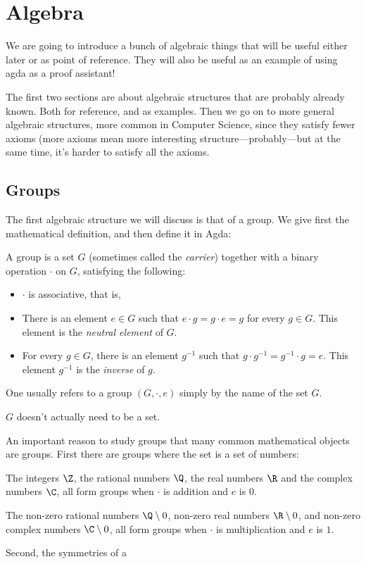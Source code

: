 \section{Algebra}
We are going to introduce a bunch of algebraic things that will be useful either later or as point of reference. They will also be useful as an example of using agda as a proof assistant!

The first two sections are about algebraic structures that are probably already known. Both for reference, and as examples. Then we go on to more general algebraic structures, more common in Computer Science, since they satisfy fewer axioms (more axioms mean more interesting structure---probably---but at the same time, it's harder to satisfy all the axioms.
\subsection{Groups}
The first algebraic structure we will discuss is that of a group. We give first the mathematical definition, and then define it in Agda:
\begin{Definition}
A group is a set $G$ (sometimes called the \emph{carrier}) together with a binary operation $\cdot$ on $G$, satisfying the following:
\begin{itemize}
\item $\cdot$ is associative, that is, 
\item There is an element $e \in G$ such that $e \cdot g = g \cdot e = g$ for every $g \in G$. This element is the \emph{neutral element} of $G$.
\item For every $g \in G$, there is an element $g^{-1}$ such that $g \cdot g^{-1} = g^{-1} \cdot g = e$. This element $g^{-1}$ is the \emph{inverse} of $g$.
\end{itemize}
\end{Definition}
\begin{Remark}
One usually refers to a group $(G, \cdot, e)$ simply by the name of the set $G$.
\end{Remark}
\begin{Remark}
$G$ doesn't actually need to be a set. 
\end{Remark}
An important reason to study groups that many common mathematical objects are groups. First there are groups where the set is a set of numbers:
\begin{Example}
  The integers $\Z$, the rational numbers $\Q$, the real numbers $\R$ and the complex numbers $\C$, all form groups when $\cdot$ is addition and $e$ is $0$.
\end{Example}
\begin{Example}
  The non-zero rational numbers $\Q\setminus{0}$, non-zero real numbers $\R\setminus{0}$, and non-zero complex numbers $\C\setminus{0}$, all form groups when $\cdot$ is multiplication and $e$ is $1$.
\end{Example}
Second, the symmetries of a 

